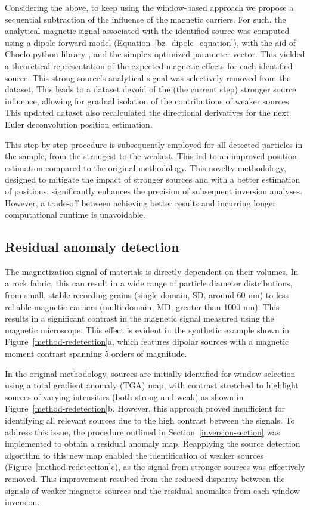     Considering the above, to keep using the window-based approach we propose a sequential subtraction of the influence of the magnetic carriers. For such, the analytical magnetic signal associated with the identified source was computed using a dipole forward model (Equation~\ref{bz_dipole_equation}), with the aid of Choclo python library \citep{choclo2022}, and the simplex optimized parameter vector. This yielded a theoretical representation of the expected magnetic effects for each identified source. This strong source's analytical signal was selectively removed from the dataset. This leads to a dataset devoid of the (the current step) stronger source influence, allowing for gradual isolation of the contributions of weaker sources. This updated dataset also recalculated the directional derivatives for the next Euler deconvolution position estimation.

    This step-by-step procedure is subsequently employed for all detected particles in the sample, from the strongest to the weakest. This led to an improved position estimation compared to the original methodology. This novelty methodology, designed to mitigate the impact of stronger sources and with a better estimation of positions, significantly enhances the precision of subsequent inversion analyses. However, a trade-off between achieving better results and incurring longer computational runtime is unavoidable.

\subsection{Residual anomaly detection}
   The magnetization signal of materials is directly dependent on their volumes. In a rock fabric, this can result in a wide range of particle diameter distributions, from small, stable recording grains (single domain, SD, around 60 nm) to less reliable magnetic carriers (multi-domain, MD, greater than 1000 nm). This results in a significant contrast in the magnetic signal measured using the magnetic microscope. This effect is evident in the synthetic example shown in Figure~\ref{method-redetection}a, which features dipolar sources with a magnetic moment contrast spanning 5 orders of magnitude. 
   
    In the original methodology, sources are initially identified for window selection using a total gradient anomaly (TGA) map, with contrast stretched to highlight sources of varying intensities (both strong and weak) as shown in Figure~\ref{method-redetection}b. However, this approach proved insufficient for identifying all relevant sources due to the high contrast between the signals. To address this issue, the procedure outlined in Section~\ref{inversion-section} was implemented to obtain a residual anomaly map. Reapplying the source detection algorithm to this new map enabled the identification of weaker sources (Figure~\ref{method-redetection}c), as the signal from stronger sources was effectively removed. This improvement resulted from the reduced disparity between the signals of weaker magnetic sources and the residual anomalies from each window inversion.

